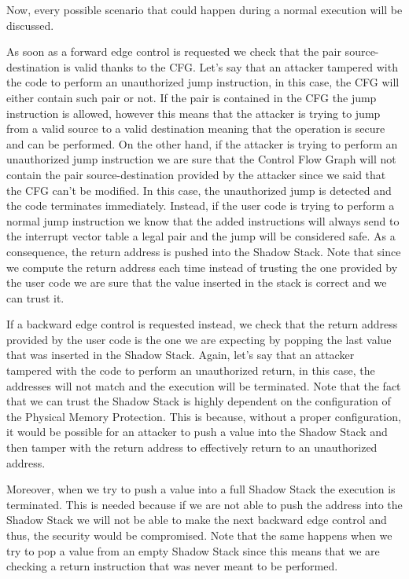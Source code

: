 Now, every possible scenario that could happen during a normal execution will be
discussed.

As soon as a forward edge control is requested we check that the pair source-destination
is valid thanks to the CFG. Let's say that an attacker tampered with the code to
perform an unauthorized jump instruction, in this case, the CFG will either contain
such pair or not. If the pair is contained in the CFG the jump instruction is
allowed, however this means that the attacker is trying to jump from a valid source
to a valid destination meaning that the operation is secure and can be performed.
On the other hand, if the attacker is trying to perform an unauthorized jump instruction
we are sure that the Control Flow Graph will not contain the pair source-destination
provided by the attacker since we said that the CFG can't be modified. In this
case, the unauthorized jump is detected and the code terminates immediately.
Instead, if the user code is trying to perform a normal jump instruction we know
that the added instructions will always send to the interrupt vector table a legal
pair and the jump will be considered safe. As a consequence, the return address is
pushed into the Shadow Stack. Note that since we compute the return address each
time instead of trusting the one provided by the user code we are sure that the
value inserted in the stack is correct and we can trust it.

If a backward edge control is requested instead, we check that the return address
provided by the user code is the one we are expecting by popping the last value that
was inserted in the Shadow Stack. Again, let's say that an attacker tampered with
the code to perform an unauthorized return, in this case, the addresses will not
match and the execution will be terminated. Note that the fact that we can trust
the Shadow Stack is highly dependent on the configuration of the Physical Memory
Protection. This is because, without a proper configuration, it would be possible
for an attacker to push a value into the Shadow Stack and then tamper with the return
address to effectively return to an unauthorized address.

Moreover, when we try to push a value into a full Shadow Stack the execution is
terminated. This is needed because if we are not able to push the address into the
Shadow Stack we will not be able to make the next backward edge control and thus,
the security would be compromised. Note that the same happens when we try to pop
a value from an empty Shadow Stack since this means that we are checking a return
instruction that was never meant to be performed.

